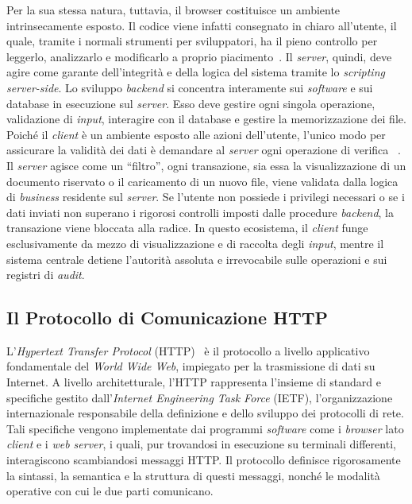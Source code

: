 Per la sua stessa natura, tuttavia, il browser costituisce un ambiente intrinsecamente esposto. Il codice viene infatti consegnato in chiaro all'utente, il quale, tramite i normali strumenti per sviluppatori, ha il pieno controllo per leggerlo, analizzarlo e modificarlo a proprio piacimento~\autocite[ch. 2]{niederstrobbinsLearningWebDesign2025}. 
Il \textit{server}, quindi, deve agire come garante dell’integrità e della logica del sistema tramite lo \textit{scripting} \textit{server-side}. Lo sviluppo \textit{backend} si concentra interamente sui \textit{software} e sui database in esecuzione sul \textit{server}. Esso deve gestire ogni singola operazione, validazione di \textit{input}, interagire con il database e gestire la memorizzazione dei file. Poiché il \textit{client} è un ambiente esposto alle azioni dell’utente, l'unico modo per assicurare la validità dei dati è demandare al \textit{server} ogni operazione di verifica~\autocite[ch. 1]{niederstrobbinsLearningWebDesign2025} .
Il \textit{server} agisce come un ``filtro'', ogni transazione, sia essa la visualizzazione di un documento riservato o il caricamento di un nuovo file, viene validata dalla logica di \textit{business} residente sul \textit{server}. Se l'utente non possiede i privilegi necessari o se i dati inviati non superano i rigorosi controlli imposti dalle procedure \textit{backend}, la transazione viene bloccata alla radice. In questo ecosistema, il \textit{client} funge esclusivamente da mezzo di visualizzazione e di raccolta degli \textit{input}, mentre il sistema centrale detiene l'autorità assoluta e irrevocabile sulle operazioni e sui registri di \textit{audit}.

\subsection{Il Protocollo di Comunicazione HTTP}
L'\textit{Hypertext Transfer Protocol} (HTTP)~\autocite[ch. 2.2]{kuroseComputerNetworkingTopdown2021} è il protocollo a livello applicativo fondamentale del \textit{World Wide Web}, impiegato per la trasmissione di dati su Internet. A livello architetturale, l'HTTP rappresenta l'insieme di standard e specifiche gestito dall'\textit{Internet Engineering Task Force} (IETF), l'organizzazione internazionale responsabile della definizione e dello sviluppo dei protocolli di rete. Tali specifiche vengono implementate dai programmi \textit{software} come i \textit{browser} lato \textit{client} e i \textit{web server}, i quali, pur trovandosi in esecuzione su terminali differenti, interagiscono scambiandosi messaggi HTTP. Il protocollo definisce rigorosamente la sintassi, la semantica e la struttura di questi messaggi, nonché le modalità operative con cui le due parti comunicano.

